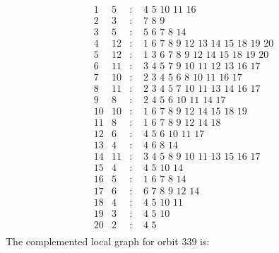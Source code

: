 \documentclass[12pt]{article}
\begin{document}
\begin{equation*}
\begin{array}{rrcl}
1&5&:&\,\,4\,\,5\,\,10\,\,11\,\,16\\
2&3&:&\,\,7\,\,8\,\,9\\
3&5&:&\,\,5\,\,6\,\,7\,\,8\,\,14\\
4&12&:&\,\,1\,\,6\,\,7\,\,8\,\,9\,\,12\,\,13\,\,14\,\,15\,\,18\,\,19\,\,20\\
5&12&:&\,\,1\,\,3\,\,6\,\,7\,\,8\,\,9\,\,12\,\,14\,\,15\,\,18\,\,19\,\,20\\
6&11&:&\,\,3\,\,4\,\,5\,\,7\,\,9\,\,10\,\,11\,\,12\,\,13\,\,16\,\,17\\
7&10&:&\,\,2\,\,3\,\,4\,\,5\,\,6\,\,8\,\,10\,\,11\,\,16\,\,17\\
8&11&:&\,\,2\,\,3\,\,4\,\,5\,\,7\,\,10\,\,11\,\,13\,\,14\,\,16\,\,17\\
9&8&:&\,\,2\,\,4\,\,5\,\,6\,\,10\,\,11\,\,14\,\,17\\
10&10&:&\,\,1\,\,6\,\,7\,\,8\,\,9\,\,12\,\,14\,\,15\,\,18\,\,19\\
11&8&:&\,\,1\,\,6\,\,7\,\,8\,\,9\,\,12\,\,14\,\,18\\
12&6&:&\,\,4\,\,5\,\,6\,\,10\,\,11\,\,17\\
13&4&:&\,\,4\,\,6\,\,8\,\,14\\
14&11&:&\,\,3\,\,4\,\,5\,\,8\,\,9\,\,10\,\,11\,\,13\,\,15\,\,16\,\,17\\
15&4&:&\,\,4\,\,5\,\,10\,\,14\\
16&5&:&\,\,1\,\,6\,\,7\,\,8\,\,14\\
17&6&:&\,\,6\,\,7\,\,8\,\,9\,\,12\,\,14\\
18&4&:&\,\,4\,\,5\,\,10\,\,11\\
19&3&:&\,\,4\,\,5\,\,10\\
20&2&:&\,\,4\,\,5\\
\end{array}
\end{equation*}
The complemented local graph for orbit $339$ is:
\end{document}
